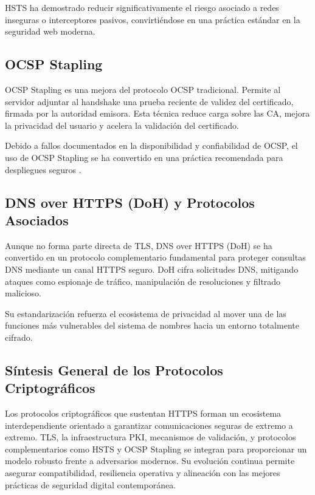 HSTS ha demostrado reducir significativamente el riesgo asociado a redes inseguras o interceptores pasivos, convirtiéndose en una práctica estándar en la seguridad web moderna.

\subsection{OCSP Stapling}

OCSP Stapling es una mejora del protocolo OCSP tradicional. Permite al servidor adjuntar al handshake una prueba reciente de validez del certificado, firmada por la autoridad emisora. Esta técnica reduce carga sobre las CA, mejora la privacidad del usuario y acelera la validación del certificado.

Debido a fallos documentados en la disponibilidad y confiabilidad de OCSP, el uso de OCSP Stapling se ha convertido en una práctica recomendada para despliegues seguros \cite{liu2015}.

\subsection{DNS over HTTPS (DoH) y Protocolos Asociados}

Aunque no forma parte directa de TLS, DNS over HTTPS (DoH) se ha convertido en un protocolo complementario fundamental para proteger consultas DNS mediante un canal HTTPS seguro. DoH cifra solicitudes DNS, mitigando ataques como espionaje de tráfico, manipulación de resoluciones y filtrado malicioso.

Su estandarización refuerza el ecosistema de privacidad al mover una de las funciones más vulnerables del sistema de nombres hacia un entorno totalmente cifrado.

\subsection{Síntesis General de los Protocolos Criptográficos}

Los protocolos criptográficos que sustentan HTTPS forman un ecosistema interdependiente orientado a garantizar comunicaciones seguras de extremo a extremo. TLS, la infraestructura PKI, mecanismos de validación, y protocolos complementarios como HSTS y OCSP Stapling se integran para proporcionar un modelo robusto frente a adversarios modernos. Su evolución continua permite asegurar compatibilidad, resiliencia operativa y alineación con las mejores prácticas de seguridad digital contemporánea.
